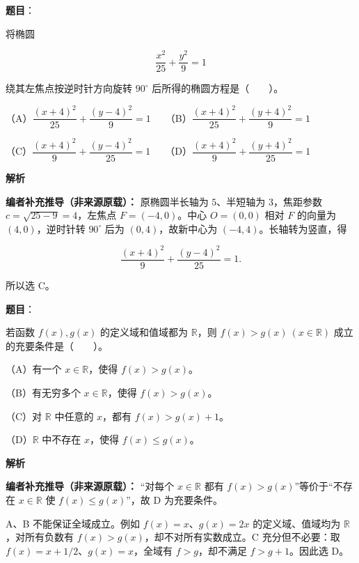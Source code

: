 \begin{answer}

\textbf{题目}：

将椭圆

\nopagebreak[4]
\[
\dfrac{x^2}{25}+\dfrac{y^2}{9}=1
\]

绕其左焦点按逆时针方向旋转 $90^\circ$ 后所得的椭圆方程是\mbox{（　　）}。

（A）$\dfrac{(x+4)^2}{25}+\dfrac{(y-4)^2}{9}=1$　　（B）$\dfrac{(x+4)^2}{25}+\dfrac{(y+4)^2}{9}=1$

（C）$\dfrac{(x+4)^2}{9}+\dfrac{(y-4)^2}{25}=1$　　（D）$\dfrac{(x+4)^2}{9}+\dfrac{(y+4)^2}{25}=1$

\textbf{解析}

\textbf{编者补充推导（非来源原载）：} 原椭圆半长轴为 $5$、半短轴为 $3$，焦距参数 $c=\sqrt{25-9}=4$，左焦点 $F=(-4,0)$。中心 $O=(0,0)$ 相对 $F$ 的向量为 $(4,0)$，逆时针转 $90^\circ$ 后为 $(0,4)$，故新中心为 $(-4,4)$。长轴转为竖直，得

\nopagebreak[4]
\[\frac{(x+4)^2}{9}+\frac{(y-4)^2}{25}=1.\]

所以选 C。


\end{answer}
\begin{answer}

\textbf{题目}：

若函数 $f(x),g(x)$ 的定义域和值域都为 $\mathbb R$，则 $f(x)>g(x)\ (x\in\mathbb R)$ 成立的充要条件是\mbox{（　　）}。

（A）有一个 $x\in\mathbb R$，使得 $f(x)>g(x)$。

（B）有无穷多个 $x\in\mathbb R$，使得 $f(x)>g(x)$。

（C）对 $\mathbb R$ 中任意的 $x$，都有 $f(x)>g(x)+1$。

（D）$\mathbb R$ 中不存在 $x$，使得 $f(x)\le g(x)$。

\textbf{解析}

\textbf{编者补充推导（非来源原载）：} “对每个 $x\in\mathbb R$ 都有 $f(x)>g(x)$”等价于“不存在 $x\in\mathbb R$ 使 $f(x)\le g(x)$”，故 D 为充要条件。

A、B 不能保证全域成立。例如 $f(x)=x$、$g(x)=2x$ 的定义域、值域均为 $\mathbb R$，对所有负数有 $f(x)>g(x)$，却不对所有实数成立。C 充分但不必要：取 $f(x)=x+1/2$、$g(x)=x$，全域有 $f>g$，却不满足 $f>g+1$。因此选 D。


\end{answer}

